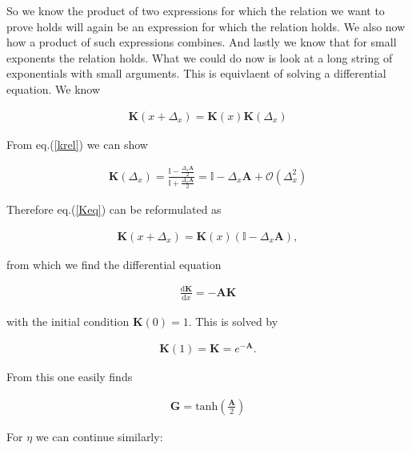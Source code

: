 \documentclass{article}
\begin{document}
	
	So we know the product of two expressions for which the relation we want to prove holds will again be an expression for which the relation holds. We also now how a product of such expressions combines. And lastly we know that for small exponents the relation holds. What we could do now is look at a long string of exponentials with small arguments. This is equivlaent of solving a differential equation. We know
	
	\begin{align}
		\boldsymbol{K}\left(x + \Delta_{x} \right)= \boldsymbol{K}\left(x\right)\boldsymbol{K}\left(\Delta_{x} \right)
		\label{Keq}
	\end{align}
	
	From eq.(\ref{krel}) we can show
	
	\begin{align}
		\boldsymbol{K}\left(\Delta_{x} \right)= \frac{\mathbb{I} - \frac{\Delta_{x}\boldsymbol{A} }{2} }{\mathbb{I} + \frac{\Delta_{x} \boldsymbol{A} }{2} }  = \mathbb{I} - \Delta_{x}\boldsymbol{A} + \mathcal{O}\left(\Delta_{x}^{2} \right)   
	\end{align}
	
	
	
	Therefore eq.(\ref{Keq}) can be reformulated as
	
	\begin{align}
		\boldsymbol{K}\left(x + \Delta_{x} \right) = \boldsymbol{K}\left(x\right)\left(\mathbb{I} - \Delta_{x}\boldsymbol{A} \right), 
	\end{align}
	
	from which we find the differential equation
	
	\begin{align}
		\frac{\mathrm{d}\boldsymbol{K} }{\mathrm{d}x} = -\boldsymbol{A} \boldsymbol{K} 
	\end{align}
	
	
	with the initial condition $\boldsymbol{K}\left(0\right) = 1$. This is solved by
	
	\begin{align}
		\boldsymbol{K}\left(1\right) = \boldsymbol{K} = e^{-\boldsymbol{A} }.
	\end{align}
	
	From this one easily finds
	
	\begin{align}
		\boldsymbol{G} = \mathrm{tanh} \left(\frac{\boldsymbol{A} }{2} \right) 
	\end{align}
	
	For $\eta$ we can continue similarly:
	
\end{document}

